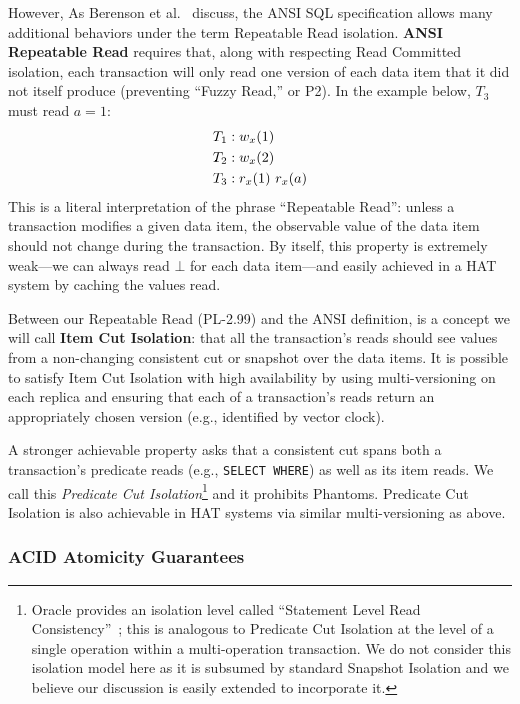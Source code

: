 However, As Berenson et al.~\cite{ansicritique} discuss, the ANSI SQL
specification allows many additional behaviors under the term
Repeatable Read isolation.  \textbf{ANSI Repeatable Read} requires
that, along with respecting Read Committed isolation, each transaction
will only read one version of each data item that it did not itself
produce (preventing ``Fuzzy Read,'' or P2). In the example below,
$T_3$ must read $a=1$:
\begin{align*}
\small
T_1 &: w_x(1)
\\T_2 &: w_x(2)
\\T_3 &: r_x(1)~r_x(a)
\end{align*}
This is a literal interpretation of the phrase ``Repeatable Read'':
unless a transaction modifies a given data item, the observable value
of the data item should not change during the transaction. By itself,
this property is extremely weak---we can always read $\bot$ for each
data item---and easily achieved in a HAT system by caching the values
read.

Between our Repeatable Read (PL-2.99) and the ANSI definition, is a
concept we will call \textbf{Item Cut Isolation}: that all the
transaction's reads should see values from a non-changing consistent
cut or snapshot over the data items. It is possible to satisfy Item
Cut Isolation with high availability by using multi-versioning on each
replica and ensuring that each of a transaction's reads return an
appropriately chosen version (e.g., identified by vector clock).

A stronger achievable property asks that a consistent cut spans both a
transaction's predicate reads (e.g., \texttt{SELECT WHERE}) as well as
its item reads.  We call this \textit{Predicate Cut
  Isolation}\footnote{Oracle provides an isolation level called
  ``Statement Level Read Consistency''~\cite{adya}; this is analogous
  to Predicate Cut Isolation at the level of a single operation within
  a multi-operation transaction. We do not consider this isolation
  model here as it is subsumed by standard Snapshot Isolation and we
  believe our discussion is easily extended to incorporate it.} and it
prohibits Phantoms. Predicate Cut Isolation is also achievable in HAT
systems via similar multi-versioning as above.

\subsubsection{ACID Atomicity Guarantees}

